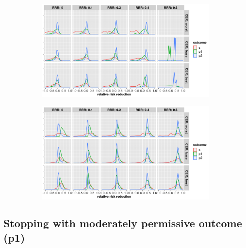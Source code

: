 \documentclass[]{article}
\begin{document}
\begin{figure}
\centering
  \caption{Distribution of relative risk reduction estimates after stopping early for (a) futility; (b) superiority.
  Results are presented for the three control event rates by rows, four relative risk reductions (by columns) and the
  three outcomes (legend).}
  \begin{subfigure}{0.8\textwidth}
    \centering
    \caption{}
    \includegraphics{../p1_plots/batch_size_nb_1000/RRRhat_fut_p1.png}
  \end{subfigure}
  \bigbreak
  \begin{subfigure}{0.8\textwidth}
    \centering
    \caption{}
    \includegraphics{../p1_plots/batch_size_nb_1000/RRRhat_sup_p1.png}
  \end{subfigure}
\end{figure}

\hypertarget{stopping-with-moderately-permissive-outcome-p1-1}{%
\subsection{Stopping with moderately permissive outcome
(p1)}\label{stopping-with-moderately-permissive-outcome-p1-1}}
\end{document}
